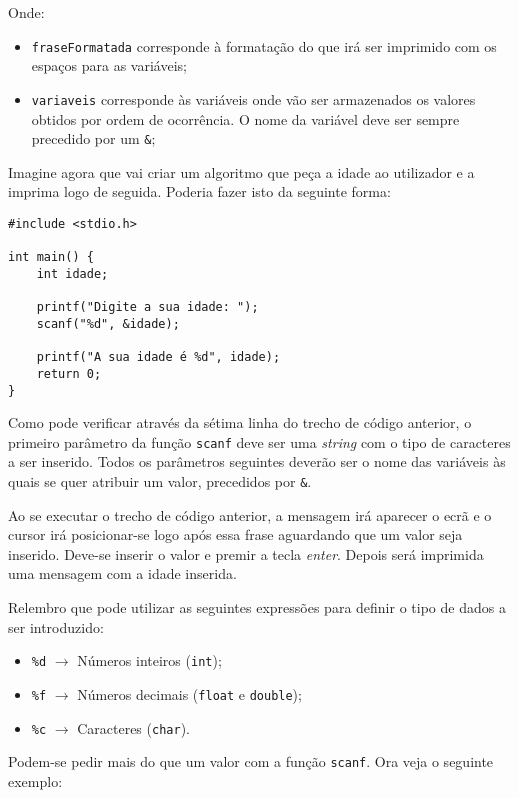 Onde:

\begin{itemize}
\item \texttt{fraseFormatada} corresponde à formatação do que irá ser imprimido com os espaços para as variáveis;
\item \texttt{variaveis} corresponde às variáveis onde vão ser armazenados os valores obtidos por ordem de ocorrência. O nome da variável deve ser sempre precedido por um \texttt{\&};
\end{itemize}

Imagine agora que vai criar um algoritmo que peça a idade ao utilizador e a imprima logo de seguida. Poderia fazer isto da seguinte forma:

\begin{lstlisting}
#include <stdio.h>
 
int main() {   
    int idade;
 
    printf("Digite a sua idade: ");
    scanf("%d", &idade);
 
    printf("A sua idade é %d", idade);
    return 0;
}
\end{lstlisting}

Como pode verificar através da sétima linha do trecho de código anterior, o primeiro parâmetro da função \texttt{scanf} deve ser uma \textit{string} com o tipo de caracteres a ser inserido. Todos os parâmetros seguintes deverão ser o nome das variáveis às quais se quer atribuir um valor, precedidos por \texttt{\&}.

Ao se executar o trecho de código anterior, a mensagem  irá aparecer o ecrã e o cursor irá posicionar-se logo após essa frase aguardando que um valor seja inserido. Deve-se inserir o valor e premir a tecla \textit{enter}. Depois será imprimida uma mensagem com a idade inserida.

Relembro que pode utilizar as seguintes expressões para definir o tipo de dados a ser introduzido:

\begin{itemize}
\item \texttt{\%d} $\rightarrow$ Números inteiros (\texttt{int});
\item \texttt{\%f} $\rightarrow$ Números decimais (\texttt{float} e \texttt{double});
\item \texttt{\%c} $\rightarrow$ Caracteres (\texttt{char}).
\end{itemize}

Podem-se pedir mais do que um valor com a função \texttt{scanf}. Ora veja o seguinte exemplo:


